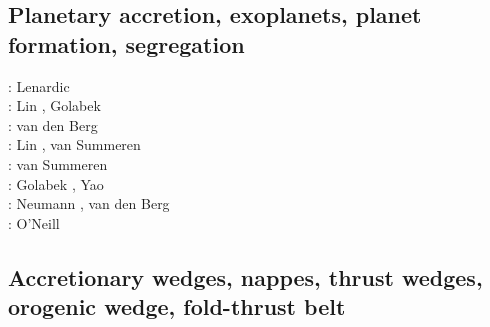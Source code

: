 \begin{scriptsize}
\cite{begl94b}
\cite{belg95a}
\cite{belg95b}
\cite{bekf96}\cite{como96}
\cite{bekk97}
\cite{pobe98}\cite{zhat98}
\cite{hans03}\cite{katf04}
\cite{huvv04}
\cite{yiha10}\cite{libe10}
\end{scriptsize}

\subsection{Planetary accretion, exoplanets, planet formation, segregation}

\begin{scriptsize}
\twothousandeight: Lenardic \etal \cite{lejm08} \\
\twothousandnine: Lin \etal \cite{ligt09}, Golabek \etal \cite{gogk09}\\
\twothousandten: van den Berg \etal \cite{vayb10}\\
\twothousandeleven: Lin \etal \cite{ligt11}, van Summeren \etal \cite{vacg11}\\
\twothousandthirteen: van Summeren \etal \cite{vagc13}\\
\twothousandfourteen: Golabek \etal \cite{gobg14}, Yao \etal \cite{yadl14}\\
\twothousandnineteen: Neumann \cite{neum19}, van den Berg \etal \cite{vayu19}\\
\twothousandtwenty: O'Neill \etal \cite{onlw20}
\end{scriptsize}

\subsection{Accretionary wedges, nappes, thrust wedges, orogenic wedge, fold-thrust belt} 

